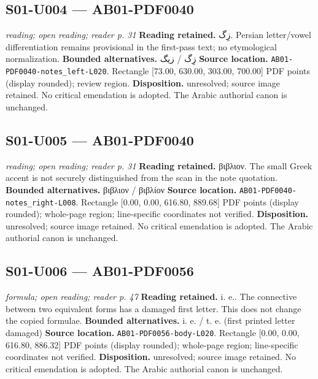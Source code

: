 \documentclass[11pt]{article}
\begin{document}
\par\noindent\begin{minipage}{\linewidth}
\subsection*{S01-U004 — AB01-PDF0040}
\textit{reading; open reading; reader p. 31}
\textbf{Reading retained.} \textarabic{زِگ}.
Persian letter/vowel differentiation remains provisional in the first-pass text; no etymological normalization.
\textbf{Bounded alternatives.} \textarabic{زِگ} / \textarabic{زیگ}
\textbf{Source location.} {\small\texttt{AB01-PDF0040-notes\_left-L020}}. Rectangle [73.00, 630.00, 303.00, 700.00] PDF points (display rounded); review region.
\textbf{Disposition.} unresolved; source image retained. No critical emendation is adopted. The Arabic authorial canon is unchanged.
\end{minipage}\par\smallskip
\par\noindent\begin{minipage}{\linewidth}
\subsection*{S01-U005 — AB01-PDF0040}
\textit{reading; open reading; reader p. 31}
\textbf{Reading retained.} \textgreek{βιβλιον}.
The small Greek accent is not securely distinguished from the scan in the note quotation.
\textbf{Bounded alternatives.} \textgreek{βιβλιον} / \textgreek{βιβλίον}
\textbf{Source location.} {\small\texttt{AB01-PDF0040-notes\_right-L008}}. Rectangle [0.00, 0.00, 616.80, 889.68] PDF points (display rounded); whole-page region; line-specific coordinates not verified.
\textbf{Disposition.} unresolved; source image retained. No critical emendation is adopted. The Arabic authorial canon is unchanged.
\end{minipage}\par\smallskip
\par\noindent\begin{minipage}{\linewidth}
\subsection*{S01-U006 — AB01-PDF0056}
\textit{formula; open reading; reader p. 47}
\textbf{Reading retained.} i. e..
The connective between two equivalent forms has a damaged first letter. This does not change the copied formulae.
\textbf{Bounded alternatives.} i. e. / t. e. (first printed letter damaged)
\textbf{Source location.} {\small\texttt{AB01-PDF0056-body-L020}}. Rectangle [0.00, 0.00, 616.80, 886.32] PDF points (display rounded); whole-page region; line-specific coordinates not verified.
\textbf{Disposition.} unresolved; source image retained. No critical emendation is adopted. The Arabic authorial canon is unchanged.
\end{minipage}\par\smallskip
\end{document}

